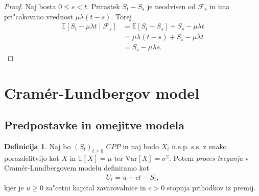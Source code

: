 \documentclass[12pt, a4paper, reqno]{amsart}
\theoremstyle{definition} %
\newtheorem{definicija}{Definicija}[section]
\theoremstyle{plain} %
\newcommand{\R}{\mathbb{R}}
\newcommand{\E}{\mathbb{E}}
\newcommand{\F}{\mathcal{F}}
\newcommand{\1}{\mathds{1}}
\newcommand{\Var}[1]{\text{Var}\left[#1\right]}
\begin{document}
        \begin{proof}
            Naj bosta $0 \leq s < t$. Prirastek $S_t - S_s$ je neodvisen od $\F_s$ in ima 
            pri"cakovano vrednost $\mu\lambda(t-s)$. Torej 
            \begin{align*}
                \E\left[S_t - \mu\lambda t\mid\F_s\right] 
                        &= \E\left[S_t - S_s\right] + S_s - \mu\lambda t\\
                        &= \mu\lambda(t-s) + S_s - \mu\lambda t\\
                        &= S_s - \mu\lambda s.
            \end{align*}
        \end{proof}


\section{Cramér-Lundbergov model}

    \begin{center}
    \end{center}

    \subsection{Predpostavke in omejitve modela}
        \begin{definicija}
            Naj bo $(S_t)_{t\geq0}$ $CPP$ in naj bodo $X_i$ n.e.p. s.s.
            z enako porazdelitvijo kot $X$ in $\E\left[X\right] = \mu$ ter $\Var{X} = \sigma^2$. Potem 
            \textit{proces tveganja} v Cramér-Lundbergovem modelu definiramo kot
            \begin{align*}
                U_t = u + ct - S_t,
            \end{align*}
            kjer je $u \geq 0$ za"cetni kapital zavarovalnice in $c>0$ stopnja prihodkov iz premij. 
            \label{def:procesTveganja}
        \end{definicija}
\end{document}

